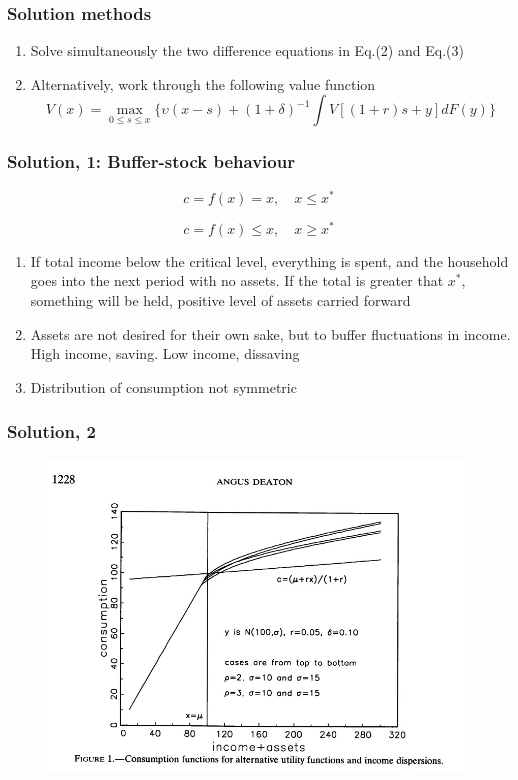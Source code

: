 \documentclass[mathserif]{beamer}
\begin{document}
\begin{frame}
\frametitle{Solution methods}
\begin{enumerate}
  \setlength\itemsep{1em}
  \item Solve simultaneously the two difference equations in Eq.(2) and Eq.(3)
  \item Alternatively, work through the following value function
    \begin{equation}
        V(x) = \underset{0 \leq s \leq x}{\max}\Bigg\{\upsilon(x-s) + (1+\delta)^{-1}\int V[(1+r)s + y] dF(y )\Bigg\}
    \end{equation}  
\end{enumerate}   
\end{frame}

\begin{frame}
\frametitle{Solution, 1: Buffer-stock behaviour}
\begin{equation*}
  c = f(x) = x, \quad x\leq x^{*}
\end{equation*}

\begin{equation*}
  c = f(x) \leq x, \quad x\geq x^{*}
\end{equation*}

\begin{enumerate}
  \item If total income below the critical level, everything is spent, and the household goes into the next period with no assets. If the total is greater that \(x^{*}\), something will be held, positive level of assets carried forward
  \item Assets are not desired for their own sake, but to buffer fluctuations in income. High income, saving. Low income, dissaving
  \item Distribution of consumption not symmetric
\end{enumerate}
\end{frame}


\begin{frame}
\frametitle{Solution, 2}
\begin{figure}
\includegraphics[height=2.5 in, scale=0.5]{figure1.jpg}
\end{figure}
\end{frame}
\end{document}
